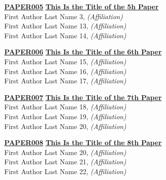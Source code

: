 \begin{enumerate}
\item[\href{https://doi.org/10.1145/1122445.1122456}{\textbf{PAPER005}}]
\href{https://doi.org/10.1145/1122445.1122456}{\textbf{This Is the Title of the 5h Paper}}\\
First Author Last Name 3, \emph{(Affiliation)}\\
First Author Last Name 13, \emph{(Affiliation)}\\
First Author Last Name 14, \emph{(Affiliation)}\\

\item[\href{https://doi.org/10.1145/1122445.1122456}{\textbf{PAPER006}}]
\href{https://doi.org/10.1145/1122445.1122456}{\textbf{This Is the Title of the 6th Paper}}\\
First Author Last Name 15, \emph{(Affiliation)}\\
First Author Last Name 16, \emph{(Affiliation)}\\
First Author Last Name 17, \emph{(Affiliation)}\\

\item[\href{https://doi.org/10.1145/1122445.1122456}{\textbf{PAPER007}}]
\href{https://doi.org/10.1145/1122445.1122456}{\textbf{This Is the Title of the 7th Paper}}\\
First Author Last Name 18, \emph{(Affiliation)}\\
First Author Last Name 19, \emph{(Affiliation)}\\
First Author Last Name 20, \emph{(Affiliation)}\\

\item[\href{https://doi.org/10.1145/1122445.1122456}{\textbf{PAPER008}}]
\href{https://doi.org/10.1145/1122445.1122456}{\textbf{This Is the Title of the 8th Paper}}\\
First Author Last Name 20, \emph{(Affiliation)}\\
First Author Last Name 21, \emph{(Affiliation)}\\
First Author Last Name 22, \emph{(Affiliation)}\\
\end{enumerate}


